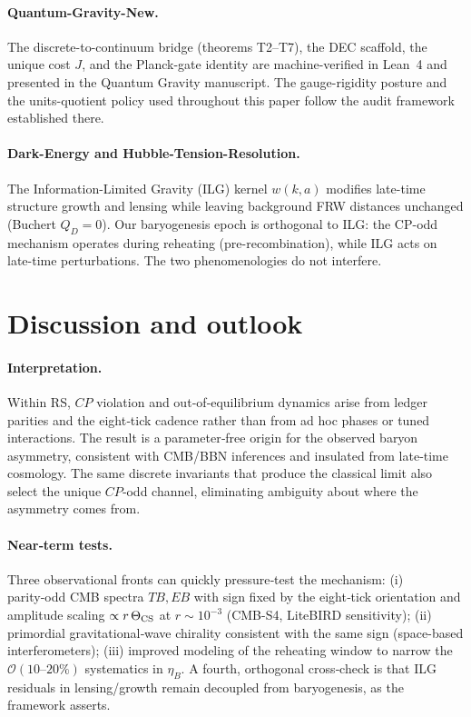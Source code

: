 \documentclass[11pt]{article}
\begin{document}
\paragraph{Quantum-Gravity-New.}
The discrete-to-continuum bridge (theorems T2–T7), the DEC scaffold, the unique cost $J$, and the Planck-gate identity are machine-verified in Lean~4 and presented in the Quantum Gravity manuscript. The gauge-rigidity posture and the units-quotient policy used throughout this paper follow the audit framework established there.

\paragraph{Dark-Energy and Hubble-Tension-Resolution.}
The Information-Limited Gravity (ILG) kernel $w(k,a)$ modifies late-time structure growth and lensing while leaving background FRW distances unchanged (Buchert $Q_D=0$). Our baryogenesis epoch is orthogonal to ILG: the CP-odd mechanism operates during reheating (pre-recombination), while ILG acts on late-time perturbations. The two phenomenologies do not interfere.

\section{Discussion and outlook}

\paragraph{Interpretation.}
Within RS, \(CP\) violation and out‑of‑equilibrium dynamics arise from ledger parities and the eight‑tick cadence rather than from ad hoc phases or tuned interactions. The result is a parameter‑free origin for the observed baryon asymmetry, consistent with CMB/BBN inferences and insulated from late‑time cosmology. The same discrete invariants that produce the classical limit also select the unique \(CP\)‑odd channel, eliminating ambiguity about where the asymmetry comes from.

\paragraph{Near‑term tests.}
Three observational fronts can quickly pressure‑test the mechanism: (i) parity‑odd CMB spectra \(TB,EB\) with sign fixed by the eight‑tick orientation and amplitude scaling \(\propto r\,\Theta_{\rm CS}\) at \(r\sim 10^{-3}\) (CMB-S4, LiteBIRD sensitivity); (ii) primordial gravitational‑wave chirality consistent with the same sign (space-based interferometers); (iii) improved modeling of the reheating window to narrow the \(\mathcal{O}(10\text{–}20\%)\) systematics in \(\eta_B\). A fourth, orthogonal cross‑check is that ILG residuals in lensing/growth remain decoupled from baryogenesis, as the framework asserts.
\end{document}
